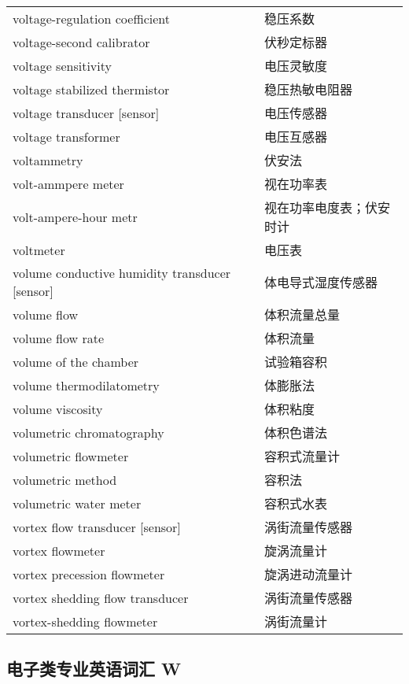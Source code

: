 \documentclass[
]{article}
\begin{document}
\begin{longtable}[]{@{}ll@{}}
voltage-regulation coefficient & 稳压系数 \\
voltage-second calibrator & 伏秒定标器 \\
voltage sensitivity & 电压灵敏度 \\
voltage stabilized thermistor & 稳压热敏电阻器 \\
voltage transducer {[}sensor{]} & 电压传感器 \\
voltage transformer & 电压互感器 \\
voltammetry & 伏安法 \\
volt-ammpere meter & 视在功率表 \\
volt-ampere-hour metr & 视在功率电度表；伏安时计 \\
voltmeter & 电压表 \\
volume conductive humidity transducer {[}sensor{]} &
体电导式湿度传感器 \\
volume flow & 体积流量总量 \\
volume flow rate & 体积流量 \\
volume of the chamber & 试验箱容积 \\
volume thermodilatometry & 体膨胀法 \\
volume viscosity & 体积粘度 \\
volumetric chromatography & 体积色谱法 \\
volumetric flowmeter & 容积式流量计 \\
volumetric method & 容积法 \\
volumetric water meter & 容积式水表 \\
vortex flow transducer {[}sensor{]} & 涡街流量传感器 \\
vortex flowmeter & 旋涡流量计 \\
vortex precession flowmeter & 旋涡进动流量计 \\
vortex shedding flow transducer & 涡街流量传感器 \\
vortex-shedding flowmeter & 涡街流量计 \\
\bottomrule()
\end{longtable}

\hypertarget{ux7535ux5b50ux7c7bux4e13ux4e1aux82f1ux8bedux8bcdux6c47-w}{%
\subsection{\texorpdfstring{电子类专业英语词汇 W
}{电子类专业英语词汇 W }}\label{ux7535ux5b50ux7c7bux4e13ux4e1aux82f1ux8bedux8bcdux6c47-w}}
\end{document}
